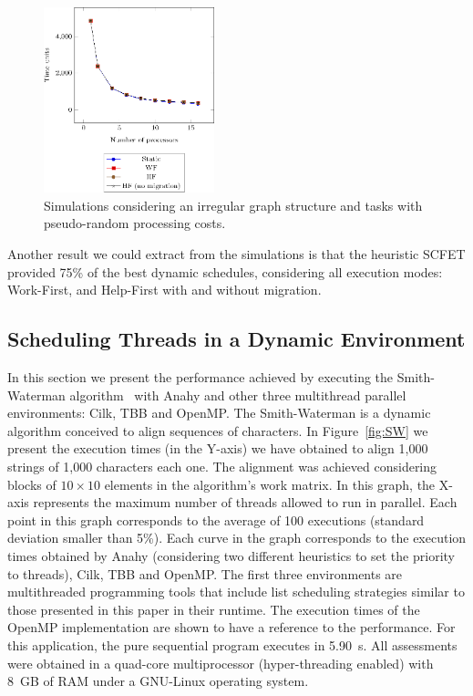 \documentclass[twocolumn]{svjour3}
\begin{document}
\begin{figure}[]
	\centering
	\includegraphics[width=0.44\textwidth,angle=0]{figs/simulation_different_costs.eps}	
	\caption{Simulations considering an irregular graph structure and tasks with pseudo-random processing costs.}
	\label{fig:simulation_different_costs}
\end{figure}

Another result we could extract from the simulations is that the heuristic SCFET provided 75\% of the best dynamic schedules, considering all execution modes: Work-First, and Help-First with and without migration.

\subsection{Scheduling Threads in a Dynamic Environment}

In this section we present the performance  achieved by executing the Smith-Waterman algorithm~\cite{smith-waterman} with Anahy and other three multithread parallel environments: Cilk, TBB and OpenMP. The Smith-Waterman is a dynamic algorithm conceived to align sequences of characters. In Figure~\ref{fig:SW} we present the execution times (in the Y-axis) we have obtained to align 1,000 strings of 1,000 characters each one. The alignment was achieved considering blocks of $10 \times 10$ elements in the algorithm's work matrix. In this graph, the X-axis represents the maximum number of threads allowed to run in parallel. Each point in this graph corresponds to the average of 100 executions (standard deviation smaller than 5\%). Each curve in the graph corresponds to the execution times obtained by Anahy (considering two different heuristics to set the priority to threads), Cilk, TBB and OpenMP. The first three environments are multithreaded programming tools that include list scheduling strategies similar to those presented in this paper in their runtime. The execution times of the OpenMP implementation are shown to have a reference to the performance. For this application, the pure sequential program executes in 5.90~s. All assessments were obtained in a quad-core multiprocessor (hyper-threading enabled) with 8~GB of RAM under a GNU-Linux operating system.
\end{document}
